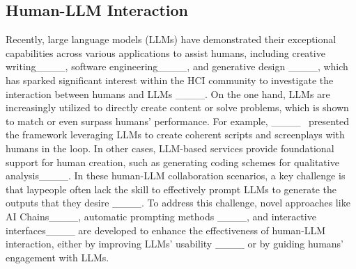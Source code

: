 \subsection{Human-LLM Interaction}

Recently, large language models (LLMs) have demonstrated their exceptional capabilities across various applications to assist humans, including creative writing____, software engineering____, and generative design ____, which has sparked significant interest within the HCI community to investigate the interaction between humans and LLMs ____. On the one hand, LLMs are increasingly utilized to directly create content or solve problems, which is shown to match or even surpass humans' performance. For example, ____~ presented the framework leveraging LLMs to create coherent scripts and screenplays with humans in the loop. 
In other cases, LLM-based services provide foundational support for human creation, such as generating coding schemes for qualitative analysis____. 
In these human-LLM collaboration scenarios, a key challenge is that laypeople often lack the skill to effectively prompt LLMs to generate the outputs that they desire ____. To address this challenge, novel approaches like AI Chains____, automatic prompting methods ____, and interactive interfaces____ are developed to enhance the effectiveness of human-LLM interaction, either by improving LLMs' usability ____ or by guiding humans' engagement with LLMs.

